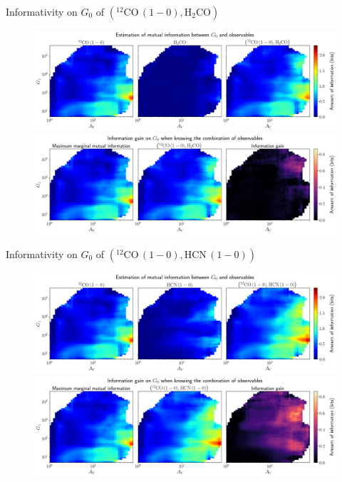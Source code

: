 \documentclass{beamer}
\begin{document}
\begin{frame}{Informativity on $G_0$ of $\left(\mathrm{^{12}CO\,(1-0)},\mathrm{H_2CO}\right)$}
    \begin{figure}
        \centering
        \includegraphics[width=0.95\linewidth]{../mi/g0__12co10_h2co_mi.png}
        \vfill
        \includegraphics[width=0.95\linewidth]{../mi/g0__12co10_h2co_mi_gain.png}
    \end{figure}
\end{frame}

\begin{frame}{Informativity on $G_0$ of $\left(\mathrm{^{12}CO\,(1-0)},\mathrm{HCN\,(1-0)}\right)$}
    \begin{figure}
        \centering
        \includegraphics[width=0.95\linewidth]{../mi/g0__12co10_hcn10_mi.png}
        \vfill
        \includegraphics[width=0.95\linewidth]{../mi/g0__12co10_hcn10_mi_gain.png}
    \end{figure}
\end{frame}
\end{document}
